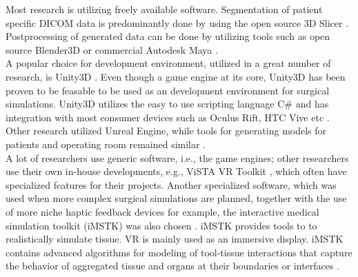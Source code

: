 Most research is utilizing freely available software.
Segmentation of patient specific DICOM data is predominantly done by using the open source 3D Slicer \cite{Barber.2018,Barber.2020}.
Postprocessing of generated data can be done by utilizing tools such as open source Blender3D or commercial Autodesk Maya \cite{Barber.2020,Parham.2019,Sampogna.2017}.
\\ A popular choice for development environment, utilized in a great number of research, is Unity3D \cite{Parham.2019,Pulijala.2017,Sampogna.2017}.
Even though a game engine at its core, Unity3D has been proven to be feasable to be used as an development environment for surgical simulations.
Unity3D utilizes the easy to use scripting language C\# and has integration with most consumer devices such as Oculus Rift, HTC Vive etc \cite{wang2010new}.
\\
Other research utilized Unreal Engine, while tools for generating models for patients and operating room remained similar \cite{Barber.2020}.
\\
A lot of researchers use generic software, i.e., the game engines; other researchers use their own in-house developments, e.g., ViSTA VR Toolkit \cite{RN70}, which often have specialized features for their projects.
Another specialized software, which was used when more complex surgical simulations are planned, together with the use of more niche haptic feedback devices for example, the interactive medical simulation toolkit (iMSTK) was also chosen \cite{VenkataS.Arikatla.2018}.
iMSTK provides tools to to realistically simulate tissue. VR is mainly used as an immersive display.
iMSTK contains advanced algorithms for modeling of tool-tissue interactions that capture the behavior of aggregated tissue and organs at their boundaries or interfaces \cite{VenkataS.Arikatla.2018}.